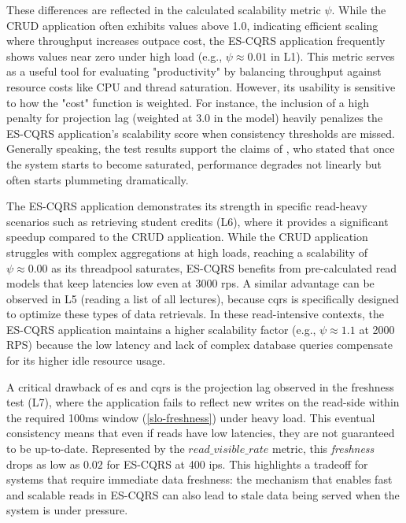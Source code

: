 These differences are reflected in the calculated scalability metric $\psi$. While the CRUD application often exhibits values above 1.0, indicating efficient scaling where throughput increases outpace cost, the ES-CQRS application frequently shows values near zero under high load (e.g., $\psi \approx 0.01$ in L1). This metric serves as a useful tool for evaluating "productivity" by balancing throughput against resource costs like CPU and thread saturation. However, its usability is sensitive to how the "cost" function is weighted. For instance, the inclusion of a high penalty for projection lag (weighted at 3.0 in the model) heavily penalizes the ES-CQRS application's scalability score when consistency thresholds are missed. Generally speaking, the test results support the claims of \textcite[Chapter 11]{abbott_art_2009}, who stated that once the system starts to become saturated, performance degrades not linearly but often starts plummeting dramatically.

The ES-CQRS application demonstrates its strength in specific read-heavy scenarios such as retrieving student credits (L6), where it provides a significant speedup compared to the CRUD application. While the CRUD application struggles with complex aggregations at high loads, reaching a scalability of $\psi \approx 0.00$ as its threadpool saturates, ES-CQRS benefits from pre-calculated read models that keep latencies low even at 3000 \gls{rps}. A similar advantage can be observed in L5 (reading a list of all lectures), because \gls{cqrs} is specifically designed to optimize these types of data retrievals. In these read-intensive contexts, the ES-CQRS application maintains a higher scalability factor (e.g., $\psi \approx 1.1$ at 2000 RPS) because the low latency and lack of complex database queries compensate for its higher idle resource usage.

A critical drawback of \acrlong{es} and \gls{cqrs} is the projection lag observed in the freshness test (L7), where the application fails to reflect new writes on the read-side within the required 100ms window (\ref{slo-freshness}) under heavy load. This eventual consistency means that even if reads have low latencies, they are not guaranteed to be up-to-date. Represented by the $read\_visible\_rate$ metric, this \emph{freshness} drops as low as $0.02$ for ES-CQRS at 400 \gls{ips}. This highlights a tradeoff for systems that require immediate data freshness: the mechanism that enables fast and scalable reads in ES-CQRS can also lead to stale data being served when the system is under pressure.

